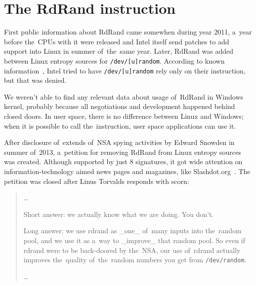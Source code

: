\chapter{The RdRand instruction}  \label{chap:rdrand-instruction}
\par{
First public information about RdRand came somewhen during year 
2011\cite{IntelRdRandFindAbout}, a~year before the~CPUs with it were released
 and Intel itself send patches to add support into Linux in summer of~the~same 
 year\cite{KernelRdRand}. Later, RdRand was added between Linux entropy 
 sources for {\tt /dev/[u]random}. According to known 
 information~\cite{TheodoreTsoNSA}, Intel tried to have {\tt /dev/[u]random} rely
  only on their instruction, but that was denied. 
}

\par{
We weren't able to find any relevant data about usage of~RdRand in Windows 
kernel, probably because all negotiations and development happened behind 
closed doors. In user space, there is no difference between Linux and Windows; 
when it is possible to call the~instruction, user space applications can use it. 
}

\par{
After disclosure of~extends of~NSA spying activities by Edward Snowden 
in summer of~2013\cite{GuardianNSA,DailymailNSA}, a~petition for removing 
RdRand from Linux entropy sources was created\cite{PetitionRdRand}. 
Although supported by just 8 signatures, it got wide attention on 
information-technology aimed news pages and magazines, like Slashdot.org~\cite{PetitionRdRandSlashdot}. The petition was closed after Linus Torvalds 
responds with scorn:
}
\begin{quote} \par{\dots}
\par{
Short answer: we actually know what we are doing. You don't.
}
\par{
Long answer: we use rdrand as \_one\_ of~many inputs into the~random pool, 
and we use it as a~way to \_improve\_ that random pool. 
So even if rdrand were to be back-doored by the~NSA, our use of~rdrand 
actually improves the~quality of~the~random numbers you get 
from {\tt /dev/random}.
}
\par{\dots}
\end{quote}

